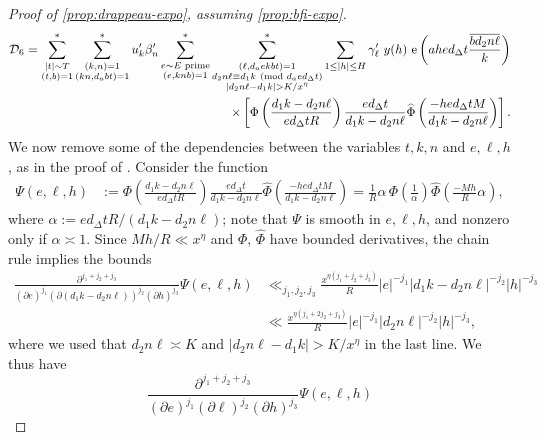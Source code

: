 \documentclass[reqno,11pt]{amsart}
\theoremstyle{definition}
\theoremstyle{remark}
\numberwithin{equation}{section}
\newcommand{\mD}{\mathcal{D}}
\newcommand{\e}{\textnormal{e}}
\renewcommand{\bar}{\overline}
\renewcommand{\hat}{\widehat}
\renewcommand{\pmod}[1]{\ (\textnormal{mod } #1)}
\begin{document}
\begin{proof}[Proof of \cref{prop:drappeau-expo}, assuming \cref{prop:bfi-expo}]
\begin{equation} \label{eq:before-partial}
\begin{aligned}
    \mD_6 = \sum^*_{\substack{|t| \sim T \\ (t, b) = 1}}
    \sum^*_{\substack{(k, n) = 1 \\ (kn, d_abt) = 1}}  u'_k \beta'_n
    \sum^*_{\substack{e \sim E \text{ prime} \\ (e, knb) = 1}}
    \sum^*_{\substack{(\ell, d_aekbt) = 1 \\ d_2 n \ell \equiv d_1 k \pmod{d_aed_\Delta t} \\ |d_2 n \ell - d_1 k | > K/x^\eta}}  
    \sum_{1 \le |h| \le H} \gamma'_\ell\ y(h)\ \e\left(ahe d_\Delta t \frac{\bar{b d_2n \ell}}{k}\right)
    \\
    \times \left[ \Phi \left(\frac{d_1 k - d_2 n \ell}{ed_\Delta tR} \right) \frac{e d_\Delta t}{d_1 k - d_2 n \ell} \hat{\Phi}\left(\frac{- h e d_\Delta t M}{d_1 k - d_2 n \ell}\right) \right].
\end{aligned}
\end{equation}
We now remove some of the dependencies between the variables $t, k, n$ and $e, \ell, h$, as in the proof of \cite[Lemma 18.4]{maynard2020primes}. Consider the function
\[
\begin{aligned}
    \Psi(e, \ell, h) &:= \Phi \left(\frac{d_1 k - d_2 n \ell}{ed_\Delta tR} \right) \frac{e d_\Delta t}{d_1 k - d_2 n \ell} \hat{\Phi}\left(\frac{-h e d_\Delta t M}{d_1 k - d_2 n \ell}\right)
    =
    \frac{1}{R} \alpha\, \Phi\left(\frac{1}{\alpha}\right) \hat{\Phi}\left(\frac{-Mh}{R} \alpha \right),
\end{aligned}
\]
where $\alpha := e d_\Delta t R / (d_1 k - d_2 n \ell)$; note that $\Psi$ is smooth in $e, \ell, h$, and nonzero only if $\alpha \asymp 1$. Since $Mh/R \ll x^\eta$ and $\Phi$, $\hat{\Phi}$ have bounded derivatives, the chain rule implies the bounds
\[
\begin{aligned}
    \frac{\partial^{j_1 + j_2 + j_3}}{(\partial e)^{j_1} (\partial (d_1 k - d_2 n \ell))^{j_2} (\partial h)^{j_3}}\Psi(e, \ell, h)
    &\ll_{j_1, j_2, j_3} \frac{x^{\eta(j_1 + j_2 + j_3)}}{R} |e|^{-j_1} |d_1 k - d_2 n \ell|^{-j_2} |h|^{-j_3}
    \\
    &\ll \frac{x^{\eta(j_1 + 2j_2 + j_3)}}{R} |e|^{-j_1} |d_2 n \ell|^{-j_2} |h|^{-j_3},
\end{aligned}
\]
where we used that $d_2 n \ell \asymp K$ and $|d_2 n \ell - d_1 k| > K/x^\eta$ in the last line. We thus have
\[
    \frac{\partial^{j_1 + j_2 + j_3}}{(\partial e)^{j_1} (\partial \ell)^{j_2} (\partial h)^{j_3}}\Psi(e, \ell, h)
\]
\end{proof}
\end{document}
